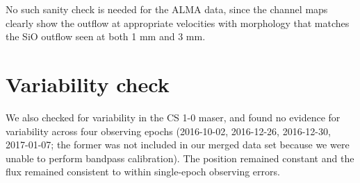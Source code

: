 \documentclass[twocolumn]{aastex62}
\begin{document}
No such sanity check is needed for the ALMA data, since the channel maps
clearly show the outflow at appropriate velocities with morphology that matches
the SiO outflow seen at both 1 mm and 3 mm.

\section{Variability check}
We also checked for variability in the CS 1-0 maser, and found no evidence for
variability across four observing epochs (2016-10-02, 2016-12-26, 2016-12-30,
2017-01-07; the former was not included in our merged data set because we were unable
to perform bandpass calibration).  The position remained constant and the flux
remained consistent to within single-epoch observing errors.


\end{document}
